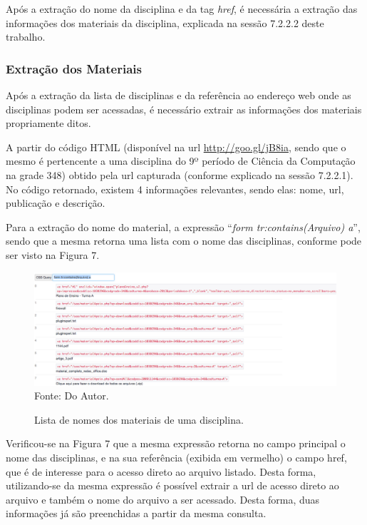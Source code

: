 Após a extração do nome da disciplina e da tag \emph{href}, é necessária a extração das informações dos materiais da disciplina, explicada na sessão 7.2.2.2 deste trabalho.

\subsubsection{Extração dos Materiais}
Após a extração da lista de disciplinas e da referência ao endereço web onde as disciplinas podem ser acessadas, é necessário extrair as informações dos materiais propriamente ditos.

A partir do código HTML (disponível na url \url{http://goo.gl/jB8ia}, sendo que o mesmo é pertencente a uma disciplina do 9º período de Ciência da Computação na grade 348) obtido pela url capturada (conforme explicado na sessão 7.2.2.1). No código retornado, existem 4 informações relevantes, sendo elas: nome, url, publicação e descrição.

Para a extração do nome do material, a expressão ``\emph{form tr:contains(Arquivo) a}'', sendo que a mesma retorna uma lista com o nome das disciplinas, conforme pode ser visto na Figura 7.

\begin{figure}[!htb]
     \centering
     \caption[Extração de Informações - Lista de Nomes dos Materiais de uma disciplina]{Lista de nomes dos materiais de uma disciplina.}
     \includegraphics[scale=0.35]{imagens/listamateriaisdisciplinasnomematerial.png}
     \\  Fonte: Do Autor.
\end{figure}

Verificou-se na Figura 7 que a mesma expressão retorna no campo principal o nome das disciplinas, e na sua referência (exibida em vermelho) o campo href, que é de interesse para o acesso direto ao arquivo listado. Desta forma, utilizando-se da mesma expressão é possível extrair a url de acesso direto ao arquivo e também o nome do arquivo a ser acessado. Desta forma, duas informações já são preenchidas a partir da mesma consulta. 

